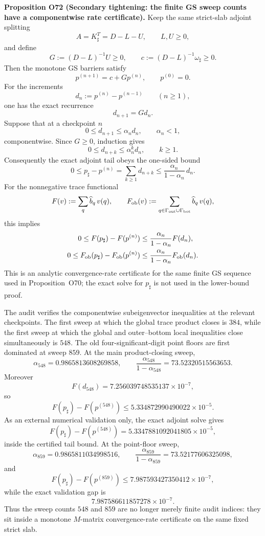 \documentclass[aps,prd,onecolumn,notitlepage,nofootinbib,superscriptaddress,11pt,floatfix]{revtex4-2}
\begin{document}
\medskip\noindent\textbf{Proposition O72 (Secondary tightening: the finite GS sweep counts have a componentwise rate certificate).}
Keep the same strict-slab adjoint splitting
\[
A=K_\sharp^T=D-L-U,\qquad L,U\ge0,
\]
and define
\[
G:=(D-L)^{-1}U\ge0,\qquad
c:=(D-L)^{-1}\omega_\sharp\ge0.
\]
Then the monotone GS barriers satisfy
\[
p^{(n+1)}=c+Gp^{(n)},\qquad p^{(0)}=0.
\]
For the increments
\[
d_n:=p^{(n)}-p^{(n-1)}\qquad(n\ge1),
\]
one has the exact recurrence
\[
d_{n+1}=Gd_n.
\]
Suppose that at a checkpoint \(n\)
\[
0\le d_{n+1}\le\alpha_n d_n,\qquad \alpha_n<1,
\]
componentwise.  Since \(G\ge0\), induction gives
\[
0\le d_{n+k}\le \alpha_n^k d_n,\qquad k\ge1.
\]
Consequently the exact adjoint tail obeys the one-sided bound
\[
0\le p_\sharp-p^{(n)}
=\sum_{k\ge1}d_{n+k}
\le
\frac{\alpha_n}{1-\alpha_n}\,d_n.
\]
For the nonnegative trace functional
\[
F(v):=\sum_q\widehat b_q\,v(q),
\qquad
F_{\rm ob}(v):=
\sum_{q\in\Gamma_{\rm out}\cup\Gamma_{\rm bot}}\widehat b_q\,v(q),
\]
this implies
\[
\begin{aligned}
0\le F(p_\sharp)-F(p^{(n)})
&\le
\frac{\alpha_n}{1-\alpha_n}F(d_n),\\
0\le F_{\rm ob}(p_\sharp)-F_{\rm ob}(p^{(n)})
&\le
\frac{\alpha_n}{1-\alpha_n}F_{\rm ob}(d_n).
\end{aligned}
\]
This is an analytic convergence-rate certificate for the same finite GS sequence used in Proposition~O70; the exact solve for \(p_\sharp\) is not used in the lower-bound proof.

The audit
verifies the componentwise subeigenvector inequalities at the relevant checkpoints.  The first sweep at which the global trace product closes is \(384\), while the first sweep at which the global and outer--bottom local inequalities close simultaneously is \(548\).  The old four-significant-digit point floors are first dominated at sweep \(859\).  At the main product-closing sweep,
\[
\alpha_{548}=0.9865813608269858,
\qquad
\frac{\alpha_{548}}{1-\alpha_{548}}=73.52320515563653.
\]
Moreover
\[
F(d_{548})=7.256039748535137\times10^{-7},
\]
so
\[
F(p_\sharp)-F(p^{(548)})
\le
5.334872990490022\times10^{-5}.
\]
As an external numerical validation only, the exact adjoint solve gives
\[
F(p_\sharp)-F(p^{(548)})
=5.3347881092041805\times10^{-5},
\]
inside the certified tail bound.  At the point-floor sweep,
\[
\alpha_{859}=0.9865811034998516,
\qquad
\frac{\alpha_{859}}{1-\alpha_{859}}=73.52177606325098,
\]
and
\[
F(p_\sharp)-F(p^{(859)})
\le
7.987593427350412\times10^{-7},
\]
while the exact validation gap is
\[
7.987586611857278\times10^{-7}.
\]
Thus the sweep counts \(548\) and \(859\) are no longer merely finite audit indices: they sit inside a monotone \(M\)-matrix convergence-rate certificate on the same fixed strict slab.
\end{document}
